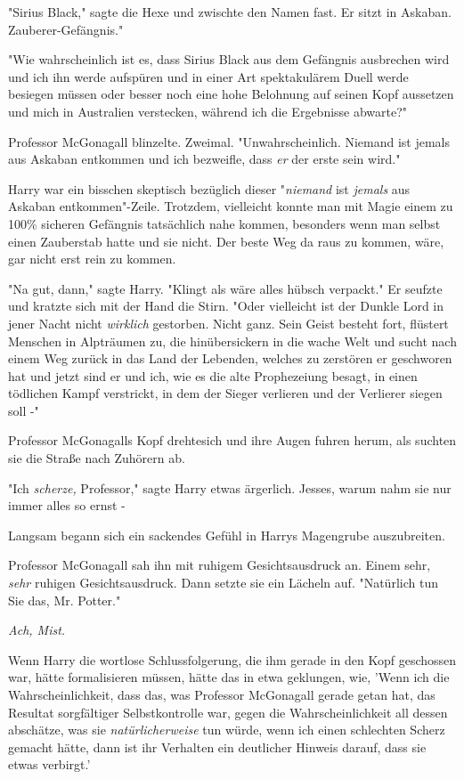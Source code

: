 {"Sirius Black," sagte die Hexe und zwischte den Namen fast. Er sitzt in Askaban. Zauberer-Gefängnis."

"Wie wahrscheinlich ist es, dass Sirius Black aus dem Gefängnis ausbrechen wird und ich ihn werde aufspüren und in einer Art spektakulärem Duell werde besiegen müssen oder besser noch eine hohe Belohnung auf seinen Kopf aussetzen und mich in Australien verstecken, während ich die Ergebnisse abwarte?"

Professor McGonagall blinzelte. Zweimal. "Unwahrscheinlich. Niemand ist jemals aus Askaban entkommen und ich bezweifle, dass \emph{er} der erste sein wird."

Harry war ein bisschen skeptisch bezüglich dieser "\emph{niemand} ist \emph{jemals} aus Askaban entkommen"-Zeile. Trotzdem, vielleicht konnte man mit Magie einem zu 100\% sicheren Gefängnis tatsächlich nahe kommen, besonders wenn man selbst einen Zauberstab hatte und sie nicht. Der beste Weg da raus zu kommen, wäre, gar nicht erst rein zu kommen.

"Na gut, dann," sagte Harry. "Klingt als wäre alles hübsch verpackt." Er seufzte und kratzte sich mit der Hand die Stirn. "Oder vielleicht ist der Dunkle Lord in jener Nacht nicht \emph{wirklich} gestorben. Nicht ganz. Sein Geist besteht fort, flüstert Menschen in Alpträumen zu, die hinübersickern in die wache Welt und sucht nach einem Weg zurück in das Land der Lebenden, welches zu zerstören er geschworen hat und jetzt sind er und ich, wie es die alte Prophezeiung besagt, in einen tödlichen Kampf verstrickt, in dem der Sieger verlieren und der Verlierer siegen soll -"

Professor McGonagalls Kopf drehtesich und ihre Augen fuhren herum, als suchten sie die Straße nach Zuhörern ab.

"Ich \emph{scherze,} Professor," sagte Harry etwas ärgerlich. Jesses, warum nahm sie nur immer alles so ernst -

Langsam begann sich ein sackendes Gefühl in Harrys Magengrube auszubreiten.

Professor McGonagall sah ihn mit ruhigem Gesichtsausdruck an. Einem sehr, \emph{sehr} ruhigen Gesichtsausdruck. Dann setzte sie ein Lächeln auf. "Natürlich tun Sie das, Mr. Potter."

\emph{Ach, Mist.}

Wenn Harry die wortlose Schlussfolgerung, die ihm gerade in den Kopf geschossen war, hätte formalisieren müssen, hätte das in etwa geklungen, wie, 'Wenn ich die Wahrscheinlichkeit, dass das, was Professor McGonagall gerade getan hat, das Resultat sorgfältiger Selbstkontrolle war, gegen die Wahrscheinlichkeit all dessen abschätze, was sie \emph{natürlicherweise} tun würde, wenn ich einen schlechten Scherz gemacht hätte, dann ist ihr Verhalten ein deutlicher Hinweis darauf, dass sie etwas verbirgt.'

}
